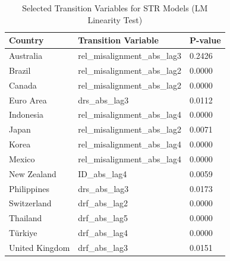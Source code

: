 \begin{table}
\caption{Selected Transition Variables for STR Models (LM Linearity Test)}
\label{tab:transition_variables}
\begin{tabular}{lll}
\toprule
Country & Transition Variable & P-value \\
\midrule
Australia & rel_misalignment_abs_lag3 & 0.2426 \\
Brazil & rel_misalignment_abs_lag2 & 0.0000 \\
Canada & rel_misalignment_abs_lag2 & 0.0000 \\
Euro Area & drs_abs_lag3 & 0.0112 \\
Indonesia & rel_misalignment_abs_lag4 & 0.0000 \\
Japan & rel_misalignment_abs_lag2 & 0.0071 \\
Korea & rel_misalignment_abs_lag4 & 0.0000 \\
Mexico & rel_misalignment_abs_lag4 & 0.0000 \\
New Zealand & ID_abs_lag4 & 0.0059 \\
Philippines & drs_abs_lag3 & 0.0173 \\
Switzerland & drf_abs_lag2 & 0.0000 \\
Thailand & drf_abs_lag5 & 0.0000 \\
Türkiye & drf_abs_lag4 & 0.0000 \\
United Kingdom & drf_abs_lag3 & 0.0151 \\
\bottomrule
\end{tabular}
\end{table}
